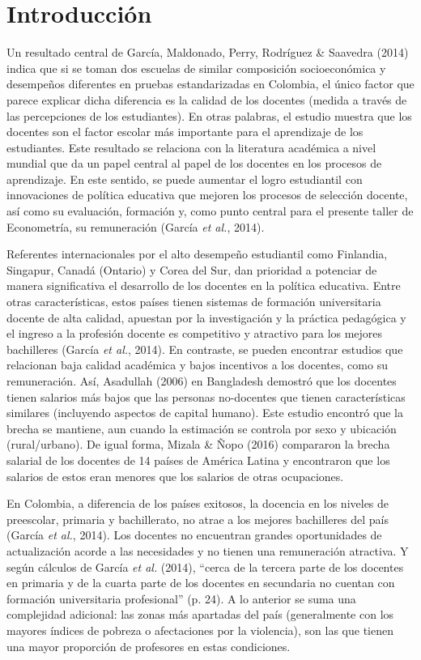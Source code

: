 \documentclass[a4paper]{article}
\begin{document}
\newpage
    \section{Introducción}
Un resultado central de García, Maldonado, Perry, Rodríguez \& Saavedra (2014) indica que si se toman dos escuelas de similar composición socioeconómica y desempeños diferentes en pruebas estandarizadas en Colombia, el único factor que parece explicar dicha diferencia es la calidad de los docentes (medida a través de las percepciones de los estudiantes). En otras palabras, el estudio muestra que los docentes son el factor escolar más importante para el aprendizaje de los estudiantes. Este resultado se relaciona con la literatura académica a nivel mundial que da un papel central al papel de los docentes en los procesos de aprendizaje. En este sentido, se puede aumentar el logro estudiantil con innovaciones de política educativa que mejoren los procesos de selección docente, así como su evaluación, formación y, como punto central para el presente taller de Econometría, su remuneración (García \textit{et al.}, 2014).

Referentes internacionales por el alto desempeño estudiantil como Finlandia, Singapur, Canadá (Ontario) y Corea del Sur, dan prioridad a potenciar de manera significativa el desarrollo de los docentes en la política educativa. Entre otras características, estos países tienen sistemas de formación universitaria docente de alta calidad, apuestan por la investigación y la práctica pedagógica y el ingreso a la profesión docente es competitivo y atractivo para los mejores bachilleres (García \textit{et al.}, 2014). En contraste, se pueden encontrar estudios que relacionan baja calidad académica y bajos incentivos a los docentes, como su remuneración. Así, Asadullah (2006) en Bangladesh demostró que los docentes tienen salarios más bajos que las personas no-docentes que tienen características similares (incluyendo aspectos de capital humano). Este estudio encontró que la brecha se mantiene, aun cuando la estimación se controla por sexo y ubicación (rural/urbano). De igual forma, Mizala \& Ñopo (2016) compararon la brecha salarial de los docentes de 14 países de América Latina y encontraron que los salarios de estos eran menores que los salarios de otras ocupaciones.

En Colombia, a diferencia de los países exitosos, la docencia en los niveles de preescolar, primaria y bachillerato, no atrae a los mejores bachilleres del país (García \textit{et al.}, 2014). Los docentes no encuentran grandes oportunidades de actualización acorde a las necesidades y no tienen una remuneración atractiva. Y según cálculos de García \textit{et al.} (2014), “cerca de la tercera parte de los docentes en primaria y de la cuarta parte de los docentes en secundaria no cuentan con formación universitaria profesional” (p. 24). A lo anterior se suma una complejidad adicional: las zonas más apartadas del país (generalmente con los mayores índices de pobreza o afectaciones por la violencia), son las que tienen una mayor proporción de profesores en estas condiciones.\\
\end{document}
